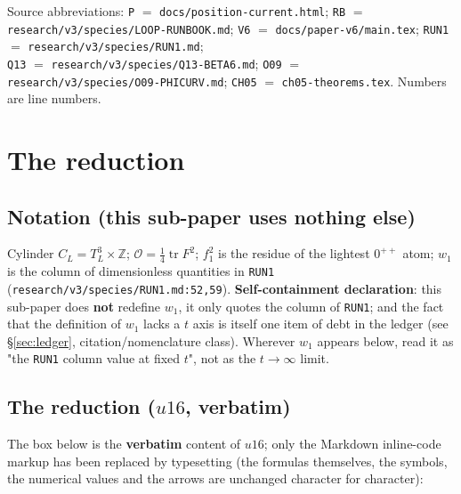 \documentclass[11pt,a4paper]{article}
\begin{document}
\begin{center}
\footnotesize\color{black!70}
Source abbreviations: \texttt{P} $=$ \texttt{docs/position-current.html}; \texttt{RB} $=$ \texttt{research/v3/species/LOOP-RUNBOOK.md};
\texttt{V6} $=$ \texttt{docs/paper-v6/main.tex}; \texttt{RUN1} $=$ \texttt{research/v3/species/RUN1.md};\\
\texttt{Q13} $=$ \texttt{research/v3/species/Q13-BETA6.md}; \texttt{O09} $=$ \texttt{research/v3/species/O09-PHICURV.md};
\texttt{CH05} $=$ \texttt{ch05-theorems.tex}. Numbers are line numbers.
\end{center}

\section{The reduction}

\subsection{Notation (this sub-paper uses nothing else)}

Cylinder $C_L=T^3_L\times\mathbb{Z}$; $\mathcal{O}=\tfrac14\operatorname{tr}F^2$; $f_1^2$ is the residue of the lightest $0^{++}$ atom;
$w_1$ is the column of dimensionless quantities in \texttt{RUN1} (\texttt{research/v3/species/RUN1.md:52,59}).
\textbf{Self-containment declaration}: this sub-paper does \textbf{not} redefine $w_1$, it only quotes the column of \texttt{RUN1}; and the fact that the definition of $w_1$ lacks a $t$ axis is itself one item of debt in the ledger (see \S\ref{sec:ledger}, citation/nomenclature class). Wherever $w_1$ appears below, read it as "the \texttt{RUN1} column value at fixed $t$", not as the $t\to\infty$ limit.

\subsection{The reduction ($u16$, verbatim)}

The box below is the \textbf{verbatim} content of $u16$; only the Markdown inline-code markup has been replaced by typesetting (the formulas themselves, the symbols, the numerical values and the arrows are unchanged character for character):
\end{document}
